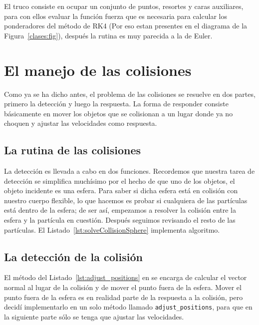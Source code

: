 El truco consiste en ocupar un conjunto de puntos, resortes y caras auxiliares, para con ellos evaluar la función fuerza que es necesaria para calcular los ponderadores del método de RK4 (Por eso estan presentes en el diagrama de la Figura~\ref{clases:fig}), después la rutina es muy parecida a la de Euler.

\section{El manejo de las colisiones}
Como ya se ha dicho antes, el problema de las colisiones se resuelve en dos partes, primero la detección y luego la respuesta.
La forma de responder consiste básicamente en mover los objetos que se colisionan a un lugar donde ya no choquen y ajustar las velocidades como respuesta.

\subsection{La rutina de las colisiones}
La detección es llevada a cabo en dos funciones.
Recordemos que nuestra tarea de detección se simplifica muchísimo por el hecho de que uno de los objetos, el objeto incidente es una esfera.
Para saber si dicha esfera está en colisión con nuestro cuerpo flexible, lo que hacemos es probar si cualquiera de las partículas está dentro de la esfera; de ser así, empezamos a resolver la colisión entre la esfera y la partícula en cuestión. Después seguimos revisando el resto de las partículas.
El Listado~\ref{lst:solveCollisionSphere} implementa algoritmo.


\subsection{La detección de la colisión}
El método del Listado~\ref{lst:adjust_positions} en se encarga de calcular el vector normal al lugar de la colisión y de mover el punto fuera de la esfera.
Mover el punto fuera de la esfera es en realidad parte de la respuesta a la colisión, pero decidí implementarlo en un solo método llamado \texttt{adjust_positions}, para que en la siguiente parte sólo se tenga que ajustar las velocidades.

